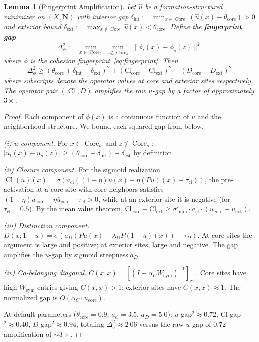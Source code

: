 \documentclass[lettersize,journal]{IEEEtran}
\newtheorem{lemma}[theorem]{Lemma}
\DeclareMathOperator{\Cl}{Cl}
\DeclareMathOperator{\Core}{Core}
\begin{document}
\begin{lemma}[Fingerprint Amplification]
\label{lem:fingerprint-amplification}
Let $\hat{u}$ be a formation-structured minimizer on $(X, \mathbf{N})$ with interior gap $\delta_{\mathrm{int}} := \min_{x \in \Core}(\hat{u}(x) - \theta_{\mathrm{core}}) > 0$ and exterior bound $\delta_{\mathrm{ext}} := \max_{x \notin \Core} \hat{u}(x) < \theta_{\mathrm{core}}$. Define the \textbf{fingerprint gap}
\[
\Delta_\phi^2 := \min_{x \in \Core_t} \min_{z \notin \Core_s} \|\phi_t(x) - \phi_s(z)\|^2
\]
where $\phi$ is the cohesion fingerprint~\eqref{eq:fingerprint}. Then
\begin{equation}
\label{eq:fingerprint-gap}
\Delta_\phi^2 \geq (\theta_{\mathrm{core}} + \delta_{\mathrm{int}} - \delta_{\mathrm{ext}})^2 + (\mathrm{Cl}_{\mathrm{core}} - \mathrm{Cl}_{\mathrm{ext}})^2 + (D_{\mathrm{core}} - D_{\mathrm{ext}})^2\end{equation}
where subscripts denote the operator values at core and exterior sites respectively. The operator pair $(\Cl, D)$ amplifies the raw $u$-gap by a factor of approximately $3\times$.
\end{lemma}

\begin{proof}
Each component of $\phi(x)$ is a continuous function of $u$ and the neighborhood structure. We bound each squared gap from below.

\emph{(i) $u$-component.} For $x \in \Core_t$ and $z \notin \Core_s$: $|u_t(x) - u_s(z)| \geq (\theta_{\mathrm{core}} + \delta_{\mathrm{int}}) - \delta_{\mathrm{ext}}$ by definition.

\emph{(ii) Closure component.} For the sigmoid realization $\Cl(u)(x) = \sigma(a_{\mathrm{cl}}((1-\eta)u(x) + \eta(Pu)(x) - \tau_{\mathrm{cl}}))$, the pre-activation at a core site with core neighbors satisfies $(1-\eta)u_{\mathrm{core}} + \eta \bar{u}_{\mathrm{core}} - \tau_{\mathrm{cl}} > 0$, while at an exterior site it is negative (for $\tau_{\mathrm{cl}} = 0.5$). By the mean value theorem, $\mathrm{Cl}_{\mathrm{core}} - \mathrm{Cl}_{\mathrm{ext}} \geq \sigma'_{\min} \cdot a_{\mathrm{cl}} \cdot (u_{\mathrm{core}} - u_{\mathrm{ext}})$.

\emph{(iii) Distinction component.} $D(x; 1-u) = \sigma(a_D(Pu(x) - \lambda_D P(1-u)(x)) - \tau_D)$. At core sites the argument is large and positive; at exterior sites, large and negative. The gap amplifies the $u$-gap by sigmoid steepness $a_D$.

\emph{(iv) Co-belonging diagonal.} $C(x,x) = [(I - \alpha_C W_{\mathrm{sym}})^{-1}]_{xx}$. Core sites have high $W_{\mathrm{sym}}$ entries giving $C(x,x) > 1$; exterior sites have $C(x,x) \approx 1$. The normalized gap is $O(\alpha_C \cdot u_{\mathrm{core}})$.

At default parameters ($\theta_{\mathrm{core}} = 0.9$, $a_{\mathrm{cl}} = 3.5$, $a_D = 5.0$): $u$-gap${}^2 \approx 0.72$, Cl-gap${}^2 \approx 0.40$, $D$-gap${}^2 \approx 0.94$, totaling $\Delta_\phi^2 \approx 2.06$ versus the raw $u$-gap of $0.72$---amplification of $\sim\!3\times$.
\end{proof}
\end{document}
